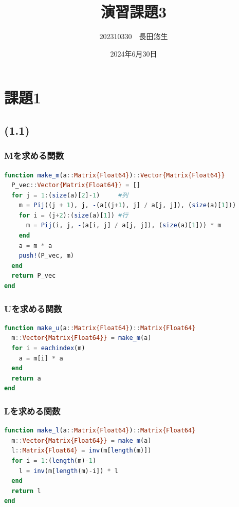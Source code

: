 \documentclass[uplatex, dvipdfmx, a4j,11pt]{jsarticle}
\title{演習課題3}
\author{202310330　長田悠生}
\date{2024年6月30日}
\begin{document}
\section*{課題1}
\subsection*{(1.1)}
\subsubsection*{Mを求める関数}

\begin{lstlisting}[title={(1.1)}, label=code:in, language=Julia]
function make_m(a::Matrix{Float64})::Vector{Matrix{Float64}}
  P_vec::Vector{Matrix{Float64}} = []
  for j = 1:(size(a)[2]-1)     #列
    m = Pij((j + 1), j, -(a[(j+1), j] / a[j, j]), (size(a)[1]))
    for i = (j+2):(size(a)[1]) #行
      m = Pij(i, j, -(a[i, j] / a[j, j]), (size(a)[1])) * m
    end
    a = m * a
    push!(P_vec, m)
  end
  return P_vec
end
\end{lstlisting}

\subsubsection*{Uを求める関数}

\begin{lstlisting}[title={(1.1)}, label=code:in, language=Julia]
function make_u(a::Matrix{Float64})::Matrix{Float64}
  m::Vector{Matrix{Float64}} = make_m(a)
  for i = eachindex(m)
    a = m[i] * a
  end
  return a
end
\end{lstlisting}

\subsubsection*{Lを求める関数}

\begin{lstlisting}[title={(1.1)}, label=code:in, language=Julia]
function make_l(a::Matrix{Float64})::Matrix{Float64}
  m::Vector{Matrix{Float64}} = make_m(a)
  l::Matrix{Float64} = inv(m[length(m)])
  for i = 1:(length(m)-1)
    l = inv(m[length(m)-i]) * l
  end
  return l
end
\end{lstlisting}
\end{document}
